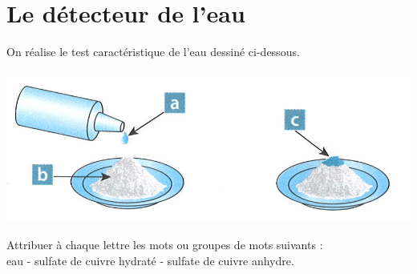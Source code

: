 \documentclass[a4paper,11pt]{exam}
\begin{document}
\section{Le détecteur de l'eau}

On réalise le test caractéristique de l'eau dessiné ci-dessous.

\begin{center}
	\includegraphics[scale=1]{schema}
\end{center}


\begin{questions}
	\question Attribuer à chaque lettre les mots ou groupes de mots suivants : \\
	eau - sulfate de cuivre hydraté - sulfate de cuivre anhydre.
\end{questions}


\ \label{LastPage}
\end{document}
